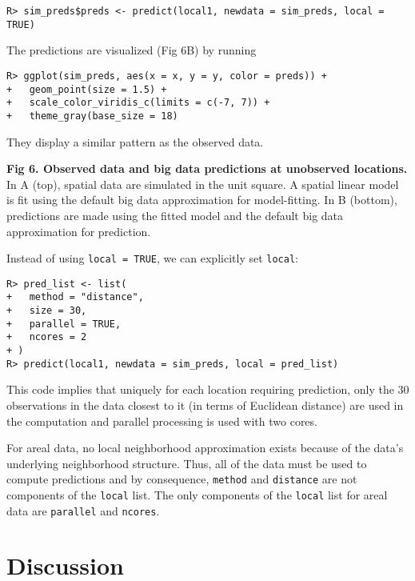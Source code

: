 \documentclass[10pt,letterpaper]{article}
\begin{document}
\begin{verbatim}
R> sim_preds$preds <- predict(local1, newdata = sim_preds, local = TRUE)
\end{verbatim}

The predictions are visualized (Fig 6B) by running

\begin{verbatim}
R> ggplot(sim_preds, aes(x = x, y = y, color = preds)) +
+   geom_point(size = 1.5) +
+   scale_color_viridis_c(limits = c(-7, 7)) + 
+   theme_gray(base_size = 18)
\end{verbatim}

They display a similar pattern as the observed data.

\textbf{Fig 6. Observed data and big data predictions at unobserved
locations.} In A (top), spatial data are simulated in the unit square. A
spatial linear model is fit using the default big data approximation for
model-fitting. In B (bottom), predictions are made using the fitted
model and the default big data approximation for prediction.

Instead of using \texttt{local\ =\ TRUE}, we can explicitly set
\texttt{local}:

\begin{verbatim}
R> pred_list <- list(
+   method = "distance",
+   size = 30,
+   parallel = TRUE,
+   ncores = 2
+ )
R> predict(local1, newdata = sim_preds, local = pred_list)
\end{verbatim}

This code implies that uniquely for each location requiring prediction,
only the 30 observations in the data closest to it (in terms of
Euclidean distance) are used in the computation and parallel processing
is used with two cores.

For areal data, no local neighborhood approximation exists because of
the data's underlying neighborhood structure. Thus, all of the data must
be used to compute predictions and by consequence, \texttt{method} and
\texttt{distance} are not components of the \texttt{local} list. The
only components of the \texttt{local} list for areal data are
\texttt{parallel} and \texttt{ncores}.

\hypertarget{sec:discussion}{%
\section{Discussion}\label{sec:discussion}}
\end{document}
